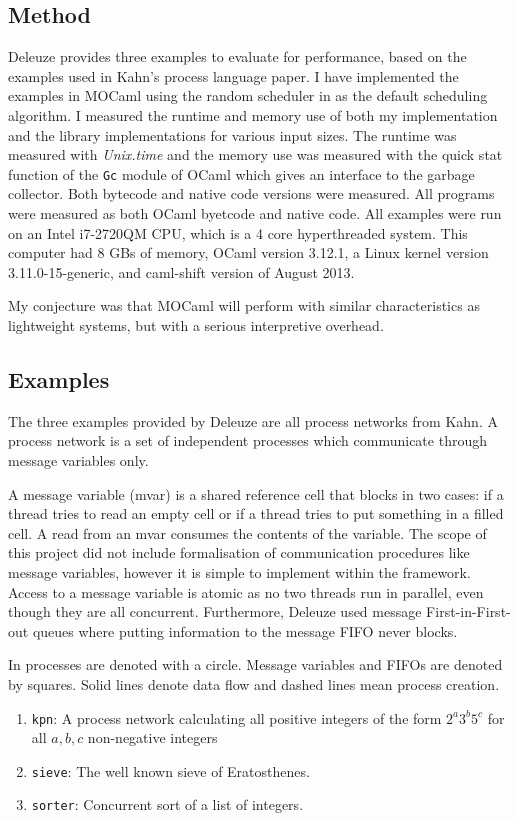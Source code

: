 \documentclass[12pt,twoside,notitlepage]{report}
\theoremstyle{plain}%
\theoremstyle{definition}
\theoremstyle{remark}
\begin{document}
\subsection{Method}
Deleuze provides three examples to evaluate for performance, based on the examples used in Kahn's process language paper\cite{kahn1976coroutines}. I have implemented the examples in MOCaml using the random scheduler in  as the default scheduling algorithm. I measured the runtime and memory use of both my implementation and the library implementations for various input sizes. The runtime was measured with \textit{Unix.time} and the memory use was measured with the quick stat function of the \verb|Gc| module of OCaml which gives an interface to the garbage collector. Both bytecode and native code versions were measured. All programs were measured as both OCaml byetcode and native code. All examples were run on an Intel i7-2720QM CPU, which is a 4 core hyperthreaded system. This computer had 8 GBs of memory, OCaml version 3.12.1, a Linux kernel version 3.11.0-15-generic, and caml-shift version of August 2013.


My conjecture was that MOCaml will perform with similar characteristics as lightweight systems, but with a serious interpretive overhead.
\subsection{Examples}
The three examples provided by Deleuze are all process networks from Kahn\cite{kahn1976coroutines}. A process network is a set of independent processes which communicate through message variables only. 

A message variable (mvar) is a shared reference cell that blocks in two cases: if a thread tries to read an empty cell or if a thread tries to put something in a filled cell. A read from an mvar consumes the contents of the variable. The scope of this project did not include formalisation of communication procedures like message variables, however it is simple to implement within the framework. Access to a message variable is atomic as no two threads run in parallel, even though they are all concurrent. Furthermore, Deleuze used message First-in-First-out queues where putting information to the message FIFO never blocks. 

In  processes are denoted with a circle. Message variables and FIFOs are denoted by squares. Solid lines denote data flow and dashed lines mean process creation.
\begin{enumerate}
\item{\verb|kpn|: A process network calculating all positive integers of the form $ 2^a3^b5^c $ for all $ a,b,c $ non-negative integers}
\item{\verb|sieve|: The well known sieve of Eratosthenes.}
\item{\verb|sorter|: Concurrent sort of a list of integers.}
\end{enumerate}
\end{document}
